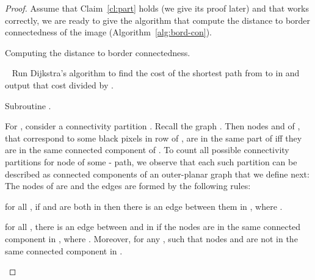 \documentclass[11pt,english]{article}
\renewenvironment{enumerate}[1]{\begin{compactenum}#1}{\end{compactenum}}
\numberwithin{figure}{section}
\begin{document}
\begin{proof}
Assume that Claim~\ref{cl:part} holds (we give its proof later) and that \Compart works correctly, we are ready to give the algorithm that compute the distance to border connectedness of the image  (Algorithm~\ref{alg:bord-con}).

\begin{algorithm}
\caption{Computing the distance to border connectedness.}
\label{alg:bord-con}
\DontPrintSemicolon
\BlankLine
{}

\nl \ 
\nl {}
\nl {}
\nl {}
\nl Run Dijkstra's algorithm to find the cost of the shortest path from  to  in  and output that cost divided by .\\
\end{algorithm}

\begin{algorithm}
\caption{Subroutine \Compart.}
\label{alg:encode}
\DontPrintSemicolon
\BlankLine

\end{algorithm}






For , consider a connectivity partition . Recall the graph . Then nodes  and  of , that correspond to some black pixels in row  of , are in the same part of  iff they are in the same connected component of . To count all possible connectivity partitions  for node  of some - path, we observe that each such partition can be described as connected components of an outer-planar graph  that we define next:
The nodes of  are  and the edges are formed by the following rules:
\begin{enumerate}
\item for all , if  and  are both in  then there is an edge between them in , where .
\item for all , there is an edge between  and  in  if the nodes are in the same connected component in , where . Moreover, for any , such that  nodes  and  are not in the same connected component in .


\end{enumerate}
\end{proof}
\end{document}
